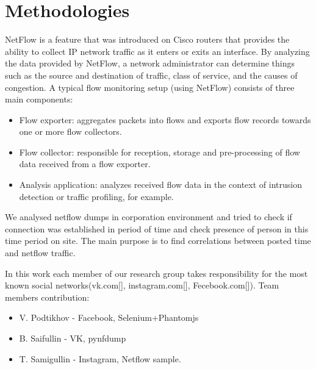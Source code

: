 \documentclass[12pt,a4paper]{report}
\begin{document}
\section{Methodologies}
NetFlow is a feature that was introduced on Cisco routers that provides the ability to collect IP network traffic as it enters or exits an interface. By analyzing the data provided by NetFlow, a network administrator can determine things such as the source and destination of traffic, class of service, and the causes of congestion. A typical flow monitoring setup (using NetFlow) consists of three main components\cite{methodologies1}:
\begin{itemize}
	\item{Flow exporter: aggregates packets into flows and exports flow records towards one or more flow collectors.}
	\item{Flow collector: responsible for reception, storage and pre-processing of flow data received from a flow exporter.}
	\item{Analysis application: analyzes received flow data in the context of intrusion detection or traffic profiling, for example.}
\end{itemize}

We analysed netflow dumps in corporation environment and tried to check if connection was established in period of time and check presence of person in this time period on site. The main purpose is to find correlations between posted time and netflow traffic.


In this work each member of our research group takes responsibility for the most known social networks(vk.com[], instagram.com[], Fecebook.com[]).
\bigbreak
Team members contribution:
\begin{itemize}
	\item{V. Podtikhov - Facebook, Selenium+Phantomjs}
	\item{B. Saifullin - VK, pynfdump}
	\item{T. Samigullin - Instagram, Netflow sample.}
\end{itemize}








\end{document}
